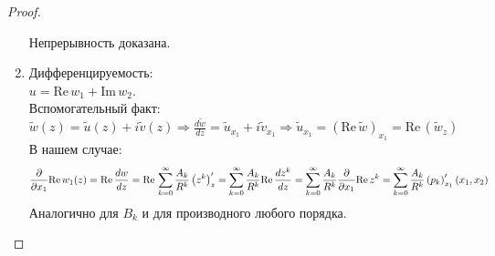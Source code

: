 \begin{proof}
\begin{enumerate}
Непрерывность доказана.
\item Дифференцируемость:\\ 
$u = \mathrm{Re}\, w_1 + \mathrm{Im}\, w_2$.\\
Вспомогательный факт: $\tilde{w}(z) = \tilde{u}(z) + i \tilde{v}(z) \Rightarrow \frac{d \tilde{w}}{d z} = \tilde{u}_{x_1} + i \tilde{v}_{x_1} \Rightarrow  \tilde{u}_{x_1} = (\mathrm{Re}\, \tilde{w})_{x_1} = \mathrm{Re}\, (\tilde{w}_z)$\\
В нашем случае: 
\[
\dfrac{\partial }{\partial x_1} \mathrm{Re}\, w_1(z) = \mathrm{Re}\, \frac{dw}{dz} = \mathrm{Re}\, \sum_{k=0}^{\infty} \frac{A_k}{R^k}\left(z^k\right)'_z = \sum_{k=0}^{\infty} \frac{A_k}{R^k}\mathrm{Re}\, \frac{dz^k}{dz} = \sum_{k=0}^{\infty} \frac{A_k}{R^k}\dfrac{\partial }{\partial x_1}\mathrm{Re}\,z^k = \sum_{k=0}^{\infty} \frac{A_k}{R^k}\left(p_k\right)'_{x_1}(x_1,x_2)
\]
Аналогично для $B_k$ и для производного любого порядка.
\end{enumerate}
\end{proof}